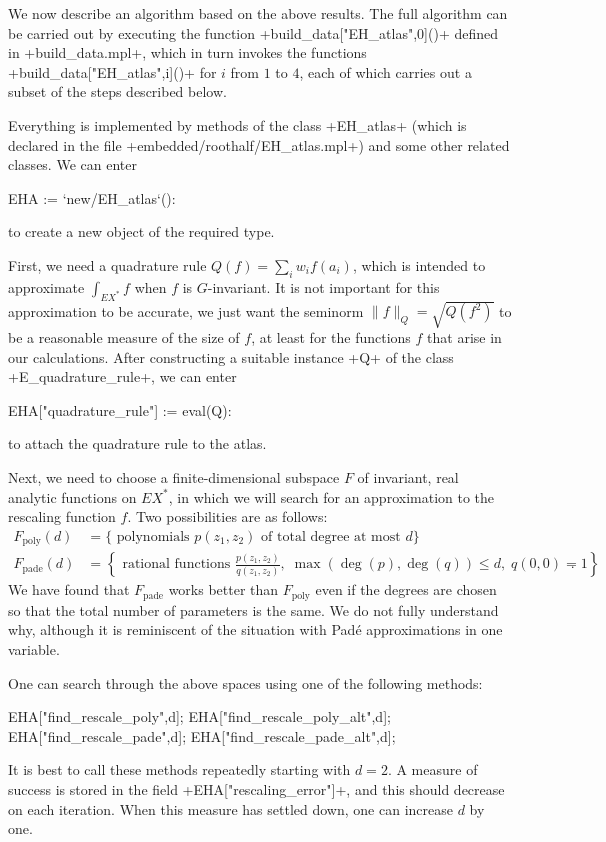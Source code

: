 \documentclass[reqno]{amsart}
\renewcommand{\:}{\colon}
\theoremstyle{definition}
\begin{document}
We now describe an algorithm based on the above results.  The full
algorithm can be carried out by executing the function
\mcode+build_data["EH_atlas",0]()+ defined in \mcode+build_data.mpl+,
which in turn invokes the functions \mcode+build_data["EH_atlas",i]()+
for $i$ from $1$ to $4$, each of which carries out a subset of the
steps described below.

Everything is implemented by methods of the class \mcode+EH_atlas+
(which is declared in the file \fname+embedded/roothalf/EH_atlas.mpl+)
and some other related classes.  We can enter
\begin{mcodeblock}
 EHA := `new/EH_atlas`():
\end{mcodeblock}
to create a new object of the required type.

First, we need a quadrature rule $Q(f)=\sum_iw_if(a_i)$,
which is intended to approximate $\int_{EX^*}f$ when $f$ is
$G$-invariant.  It is not important for this approximation to be
accurate, we just want the seminorm $\|f\|_Q=\sqrt{Q(f^2)}$ to be a
reasonable measure of the size of $f$, at least for the functions $f$
that arise in our calculations.  After constructing a suitable
instance \mcode+Q+ of the class \mcode+E_quadrature_rule+, we can
enter
\begin{mcodeblock}
 EHA["quadrature_rule"] := eval(Q):
\end{mcodeblock}
to attach the quadrature rule to the atlas.

Next, we need to choose a finite-dimensional subspace $F$ of
invariant, real analytic functions on $EX^*$, in which we will search
for an approximation to the rescaling function $f$.  Two possibilities
are as follows:
\begin{align*}
 F_{\text{poly}}(d) &=
  \{\text{ polynomials } p(z_1,z_2)
     \text{ of total degree at most } d\} \\
 F_{\text{pade}}(d) &=
  \left\{\text{ rational functions } \frac{p(z_1,z_2)}{q(z_1,z_2)},\;
     \max(\deg(p),\deg(q)) \leq d,\; q(0,0)=1\right\}.
\end{align*}
We have found that $F_{\text{pade}}$ works better than
$F_{\text{poly}}$ even if the degrees are chosen so that the total
number of parameters is the same.  We do not fully understand why,
although it is reminiscent of the situation with Pad\'e approximations
in one variable.

One can search through the above spaces using one of the following
methods:
\begin{mcodeblock}
 EHA["find_rescale_poly",d];
 EHA["find_rescale_poly_alt",d];
 EHA["find_rescale_pade",d];
 EHA["find_rescale_pade_alt",d];
\end{mcodeblock}
It is best to call these methods repeatedly starting with $d=2$.  A
measure of success is stored in the field
\mcode+EHA["rescaling_error"]+, and this should decrease on each
iteration.  When this measure has settled down, one can increase $d$
by one.
\end{document}
